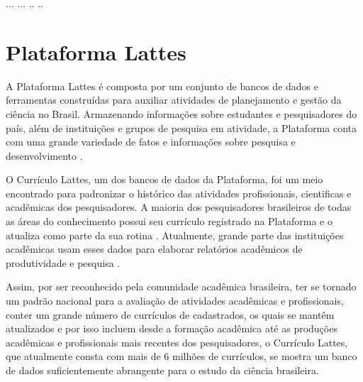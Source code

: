 ... ... .. ..


\section{Plataforma Lattes}

A Plataforma Lattes é composta por um conjunto de bancos de dados e ferramentas construídas para auxiliar atividades de planejamento e gestão da ciência no Brasil. Armazenando informações sobre estudantes e pesquisadores do país, além de instituições e grupos de pesquisa em atividade, a Plataforma conta com uma grande variedade de fatos e informações sobre pesquisa e desenvolvimento \cite{medeiros2013dynamics}.

O Currículo Lattes, um dos bancos de dados da Plataforma, foi um meio encontrado para padronizar o histórico das atividades profissionais, cientificas e acadêmicas dos pesquisadores. A maioria dos pesquisadores brasileiros de todas as áreas do conhecimento possui seu currículo registrado na Plataforma \cite{mena2014brazilian} e o atualiza como parte da sua rotina \cite{medeiros2013dynamics}. Atualmente, grande parte das instituições acadêmicas usam esses dados para elaborar relatórios acadêmicos de produtividade e pesquisa \cite{mena2009scriptlattes}.

Assim, por ser reconhecido pela comunidade acadêmica brasileira, ter se tornado um padrão nacional para a avaliação de atividades acadêmicas e profissionais, conter um grande número de currículos de cadastrados, os quais se mantêm atualizados e por isso incluem desde a formação acadêmica até as produções acadêmicas e profissionais mais recentes dos pesquisadores, o Currículo Lattes, que atualmente consta com mais de 6 milhões de currículos, se mostra um banco de dados suficientemente abrangente para o estudo da ciência brasileira.
